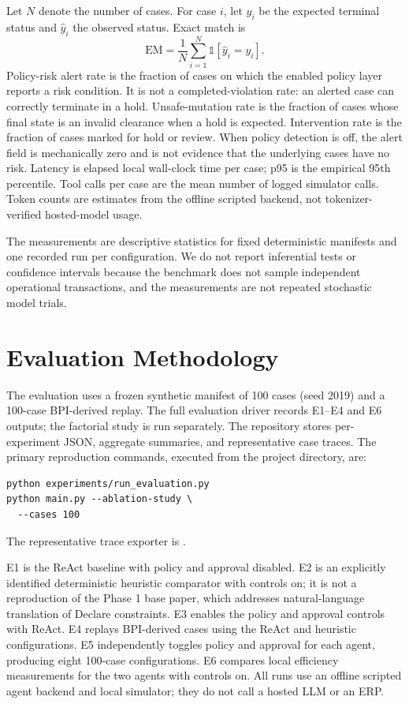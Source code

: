 \documentclass[conference]{IEEEtran}
\begin{document}
Let \(N\) denote the number of cases. For case \(i\), let \(y_i\) be the expected terminal status and \(\hat y_i\) the observed status. Exact match is
\[
\mathrm{EM}=\frac{1}{N}\sum_{i=1}^{N}\mathbb{1}[\hat y_i=y_i].
\]
Policy-risk alert rate is the fraction of cases on which the enabled policy layer reports a risk condition. It is not a completed-violation rate: an alerted case can correctly terminate in a hold. Unsafe-mutation rate is the fraction of cases whose final state is an invalid clearance when a hold is expected. Intervention rate is the fraction of cases marked for hold or review. When policy detection is off, the alert field is mechanically zero and is not evidence that the underlying cases have no risk. Latency is elapsed local wall-clock time per case; p95 is the empirical 95th percentile. Tool calls per case are the mean number of logged simulator calls. Token counts are estimates from the offline scripted backend, not tokenizer-verified hosted-model usage.

The measurements are descriptive statistics for fixed deterministic manifests and one recorded run per configuration. We do not report inferential tests or confidence intervals because the benchmark does not sample independent operational transactions, and the measurements are not repeated stochastic model trials.

\section{Evaluation Methodology}

The evaluation uses a frozen synthetic manifest of 100 cases (seed 2019) and a 100-case BPI-derived replay. The full evaluation driver records E1--E4 and E6 outputs; the factorial study is run separately. The repository stores per-experiment JSON, aggregate summaries, and representative case traces. The primary reproduction commands, executed from the project directory, are:

\footnotesize
\begin{verbatim}
python experiments/run_evaluation.py
python main.py --ablation-study \
  --cases 100
\end{verbatim}
\normalsize

The representative trace exporter is .

E1 is the ReAct baseline with policy and approval disabled. E2 is an explicitly identified deterministic heuristic comparator with controls on; it is not a reproduction of the Phase 1 base paper, which addresses natural-language translation of Declare constraints. E3 enables the policy and approval controls with ReAct. E4 replays BPI-derived cases using the ReAct and heuristic configurations. E5 independently toggles policy and approval for each agent, producing eight 100-case configurations. E6 compares local efficiency measurements for the two agents with controls on. All runs use an offline scripted agent backend and local simulator; they do not call a hosted LLM or an ERP.
\end{document}

